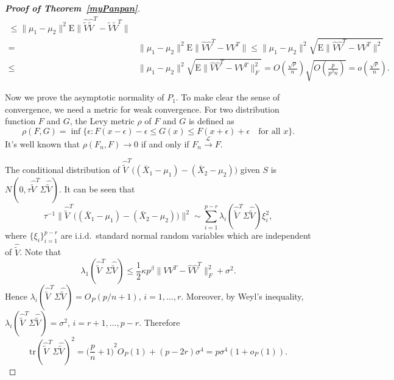 \documentclass[review]{elsarticle}
\theoremstyle{plain}
\theoremstyle{definition}
\theoremstyle{remark}
\begin{document}
\begin{proof}[\textbf{Proof of Theorem~\ref{myPanpan}}]
\begin{equation*}
\begin{aligned}
            \leq 
            \|\mu_1-\mu_2\|^2\mathrm{E}\|\hat{\tilde{V}}\hat{\tilde{V}}^T-\tilde{V}\tilde{V}^T\|\\
            =& 
            \|\mu_1-\mu_2\|^2\mathrm{E}\|\hat{V}\hat{V}^T-VV^T\|
            \leq 
            \|\mu_1-\mu_2\|^2\sqrt{\mathrm{E}\|\hat{V}\hat{V}^T-VV^T\|^2}\\
            \leq &
            \|\mu_1-\mu_2\|^2\sqrt{\mathrm{E}\|\hat{V}\hat{V}^T-VV^T\|^2_F}
            =O(\frac{\sqrt{p}}{n})\sqrt{O(\frac{p}{p^{\beta}n})}=o(\frac{\sqrt{p}}{n}).
        \end{aligned}
    \end{equation*}

    Now we prove the asymptotic normality of $P_1$. To make clear the sense of convergence, we need a metric for weak convergence. For two distribution function $F$ and $G$, the Levy metric $\rho$ of $F$ and $G$ is defined as
    $$
   \rho(F,G) =\inf\{\epsilon:F(x-\epsilon)-\epsilon\leq G(x)\leq F(x+\epsilon)+\epsilon\quad \textrm{for all $x$}\}.
    $$
    It's well known that $\rho(F_n,F)\to 0$ if and only if $F_n\xrightarrow{\mathcal{L}}F$.

    The conditional distribution of
    $\hat{\tilde{V}}^T\big((\bar{X}_1-\mu_1)-(\bar{X}_2-\mu_2)\big)$ given $S$ is $N(0,\tau \hat{\tilde{V}}^T\Sigma\hat{\tilde{V}})$.
It can be seen that 
$$\tau^{-1}\big\|\hat{\tilde{V}}^T\big((\bar{X}_1-\mu_1)-(\bar{X}_2-\mu_2)\big)\big\|^2
\sim
    \sum_{i=1}^{p-r} \lambda_i(\hat{\tilde{V}}^T\Sigma\hat{\tilde{V}})\xi_i^2,
    $$
where $\{\xi_i\}_{i=1}^{p-r}$ are i.i.d.\  standard normal random variables which are independent of $\hat{\tilde{V}}$.
    Note that
    $$
     \lambda_1(\hat{\tilde{V}}^T\Sigma\hat{\tilde{V}})\leq 
    \frac{1}{2}\kappa p^\beta \|VV^T -\hat{V}\hat{V}^T\|^2_F+\sigma^2.
    $$
    Hence $\lambda_i(\hat{\tilde{V}}^T\Sigma\hat{\tilde{V}})=O_P({p}/{n}+1)$, $i=1,\ldots,r$.
    Moreover, by Weyl's inequality,
    $
    \lambda_i(\hat{\tilde{V}}^T\Sigma\hat{\tilde{V}})=\sigma^2
    $, $i=r+1,\ldots,p-r$.
    Therefore
\begin{equation}\label{traceA1}
\mathrm{tr}(\hat{\tilde{V}}^T\Sigma\hat{\tilde{V}})^2=
    {\big(\frac{p}{n}+1\big)}^2O_P(1)
    +
    (p-2r)\sigma^4
    =p\sigma^4(1+o_P(1)).
\end{equation}


\end{proof}
\end{document}
